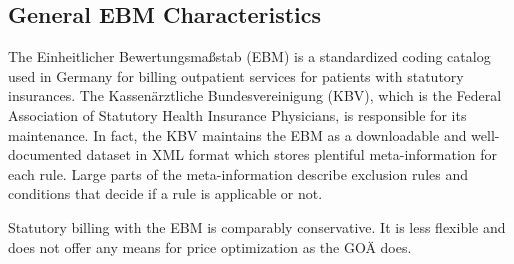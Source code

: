 \subsection{General EBM Characteristics}\label{subsec:general-ebm-characteristics}
The Einheitlicher Bewertungsmaßstab (EBM) is a standardized coding catalog used in Germany for billing outpatient services for patients with statutory insurances.
The Kassenärztliche Bundesvereinigung (KBV), which is the Federal Association of Statutory Health Insurance Physicians\cite[]{hermanns2015ebm}, is responsible for its maintenance.
In fact, the KBV maintains the EBM as a downloadable and well-documented dataset in XML format which stores plentiful meta-information for each rule.
Large parts of the meta-information describe exclusion rules and conditions that decide if a rule is applicable or not.

Statutory billing with the EBM is comparably conservative.
It is less flexible and does not offer any means for price optimization as the GOÄ does.



